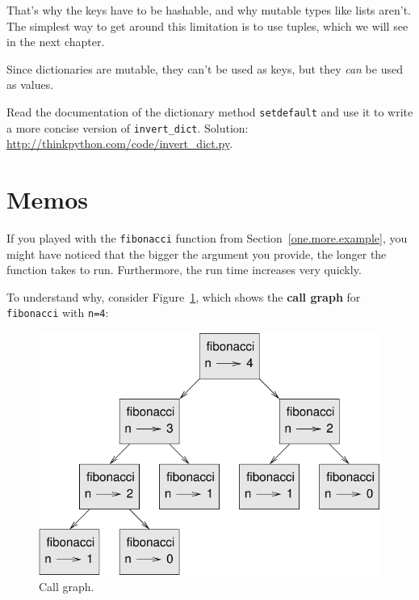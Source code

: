 \documentclass[10pt]{book}
\begin{document}
\begin{CJK}{UTF8}{gbsn}
That's why the keys have to be hashable, and why mutable types like
lists aren't.  The simplest way to get around this limitation is to
use tuples, which we will see in the next chapter.

Since dictionaries are mutable, they can't be used as keys,
but they {\em can} be used as values.

\begin{exercise}
Read the documentation of the dictionary method {\tt setdefault}
and use it to write a more concise version of \verb"invert_dict".
Solution: \url{http://thinkpython.com/code/invert_dict.py}.

\end{exercise}


\section{Memos}

If you played with the {\tt fibonacci} function from
Section~\ref{one.more.example}, you might have noticed that the bigger
the argument you provide, the longer the function takes to run.
Furthermore, the run time increases very quickly.

To understand why, consider Figure~\ref{fig.fibonacci}, which shows
the {\bf call graph} for {\tt fibonacci} with {\tt n=4}:

\begin{figure}
\centerline
{\includegraphics[scale=0.7]{figs/fibonacci.pdf}}
\caption{Call graph.}
\label{fig.fibonacci}
\end{figure}


\end{CJK}
\end{document}
